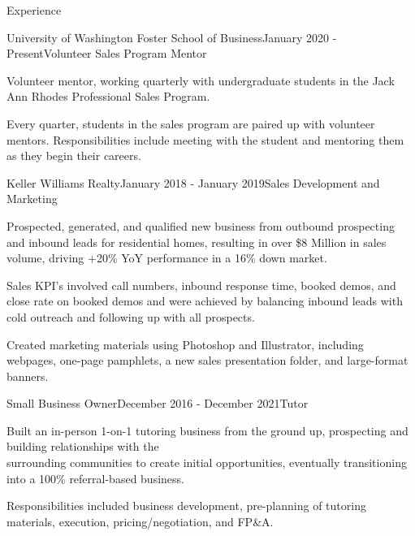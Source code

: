 \documentclass[
	11pt, %
]{resume} %
\begin{document}
\begin{rSection}{Experience}
\newpage

        \begin{rSubsection}{University of Washington Foster School of 
        Business}{January 2020 - Present}{Volunteer Sales Program Mentor}{}
            \item Volunteer mentor, working quarterly with undergraduate students in the Jack Ann Rhodes Professional Sales Program.
        
            \item Every quarter, students in the sales program are paired up with volunteer mentors. Responsibilities include meeting with the student and mentoring them as they begin their careers.
            
        \end{rSubsection}
        
	\begin{rSubsection}{Keller Williams Realty}{January 2018 - January 2019}{Sales Development and Marketing}{}
		\item Prospected, generated, and qualified new business from outbound prospecting and inbound leads for residential homes, resulting in over \$8 Million in sales volume, driving +20\% YoY performance in a 16\% down market.
            \item Sales KPI's involved call numbers, inbound response time, booked demos, and close rate on booked demos and were achieved by balancing inbound leads with cold outreach and following up with all prospects.
            \item Created marketing materials using Photoshop and Illustrator, including webpages, one-page pamphlets, a new sales presentation folder, and large-format banners.
		
	\end{rSubsection}

        \begin{rSubsection}{Small Business Owner}{December 2016 - December 2021}{Tutor}{}
            \item Built an in-person 1-on-1 tutoring business from the ground up, prospecting and building relationships with the \\surrounding communities to create initial opportunities, eventually transitioning into a 100\% referral-based business.
            \item Responsibilities included business development, pre-planning of tutoring materials, execution, pricing/negotiation, and FP\&A.
           

\end{rSubsection}
\end{rSection}
\end{document}
